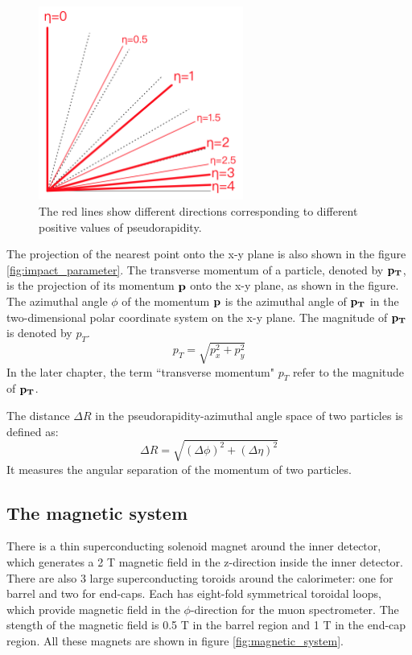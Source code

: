 \begin{figure}
\centering
\includegraphics[width=0.6\textwidth]{data/photo/detector/pseudorapidity.png}
\caption{The red lines show different directions corresponding to different positive values of pseudorapidity. \cite{pseudorapidity}}
\label{fig:pseudorapidity}
\end{figure}

The projection of the nearest point onto the x-y plane is also shown in the figure \ref{fig:impact_parameter}.
The transverse momentum of a particle, denoted by $\bf{p}_T$, is the projection of its momentum $\bf{p}$ onto the x-y plane, as shown in the figure.
The azimuthal angle $\phi$ of the momentum $\bf{p}$ is the azimuthal angle of $\bf{p}_T$ in the two-dimensional polar coordinate system on the x-y plane.
The magnitude of $\bf{p}_T$ is denoted by $p_T$.
\begin{equation}
p_T = \sqrt{p_x^2 + p_y^2}
\end{equation}
In the later chapter, the term ``transverse momentum" $p_T$ refer to the magnitude of $\bf{p}_T$.

The distance $\Delta R$ in the pseudorapidity-azimuthal angle space of two particles is defined as:
\begin{equation}
\Delta R = \sqrt{(\Delta \phi) ^2 + (\Delta \eta) ^2}
\end{equation}
It measures the angular separation of the momentum of two particles.

\subsection{The magnetic system}
There is a thin superconducting solenoid magnet around the inner detector, which generates a 2 T magnetic field in the z-direction inside the inner detector.
There are also 3 large superconducting toroids around the calorimeter: one for barrel and two for end-caps.
Each has eight-fold symmetrical toroidal loops, which provide magnetic field in the $\phi$-direction for the muon spectrometer.
The stength of the magnetic field is 0.5 T in the barrel region and 1 T in the end-cap region.
All these magnets are shown in figure \ref{fig:magnetic_system}.

